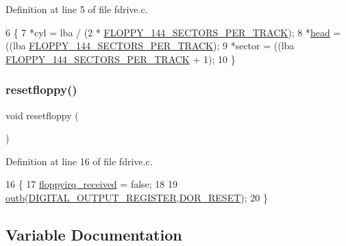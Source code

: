 Definition at line 5 of file fdrive.\+c.


\begin{DoxyCode}
6 \{
7     *cyl    = lba / (2 * \hyperlink{a00029_a04d40064bde801f12fb73134cf328150_a04d40064bde801f12fb73134cf328150}{FLOPPY\_144\_SECTORS\_PER\_TRACK});
8     *\hyperlink{a00161_ac630e1c7e5feeaaf43837648134a0c6d_ac630e1c7e5feeaaf43837648134a0c6d}{head}   = ((lba %
      \hyperlink{a00029_a04d40064bde801f12fb73134cf328150_a04d40064bde801f12fb73134cf328150}{FLOPPY\_144\_SECTORS\_PER\_TRACK});
9     *sector = ((lba %
      \hyperlink{a00029_a04d40064bde801f12fb73134cf328150_a04d40064bde801f12fb73134cf328150}{FLOPPY\_144\_SECTORS\_PER\_TRACK} + 1);
10 \}
\end{DoxyCode}
\mbox{\label{a00029_ad64d38a767bc5f30a3e13a5b01b9cf35_ad64d38a767bc5f30a3e13a5b01b9cf35}} 
\subsubsection{\texorpdfstring{resetfloppy()}{resetfloppy()}}
{\footnotesize\ttfamily void resetfloppy (\begin{DoxyParamCaption}{ }\end{DoxyParamCaption})}



Definition at line 16 of file fdrive.\+c.


\begin{DoxyCode}
16                    \{
17     \hyperlink{a00029_a2cfa75d25a7da8cb54551c7840e80d40_a2cfa75d25a7da8cb54551c7840e80d40}{floppyirq\_received} = \textcolor{keyword}{false};
18 
19     \hyperlink{a00158_aa37f5841c54156a4b14fc0d6f626b44f_aa37f5841c54156a4b14fc0d6f626b44f}{outb}(\hyperlink{a00029_a203a664e6f1b58c27efb4db8ff9db144_a203a664e6f1b58c27efb4db8ff9db144a9767b7f5f447d5346411d03077fea82a}{DIGITAL\_OUTPUT\_REGISTER},\hyperlink{a00029_a6ef9f5776b2d959e47c6c42111900071_a6ef9f5776b2d959e47c6c42111900071}{DOR\_RESET});
20 \}
\end{DoxyCode}


\subsection{Variable Documentation}
\mbox{\label{a00029_a2cfa75d25a7da8cb54551c7840e80d40_a2cfa75d25a7da8cb54551c7840e80d40}} 
